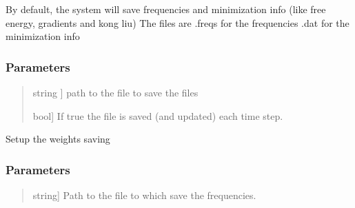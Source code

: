 \documentclass[a4paper,11pt,english]{sphinxmanual}
\begin{document}
\begin{fulllineitems}
\begin{fulllineitems}
\sphinxAtStartPar
By default, the system will save frequencies and minimization info (like free energy, gradients and kong liu)
The files are
.freqs   for the frequencies
.dat     for the minimization info


\subsubsection{Parameters}
\label{\detokenize{apireference:id45}}\begin{quote}
\begin{description}
\sphinxlineitem{fname}{[}string {]}
\sphinxAtStartPar
path to the file to save the files

\sphinxlineitem{save\_each\_step}{[}bool{]}
\sphinxAtStartPar
If true the file is saved (and updated) each time step.

\end{description}
\end{quote}

\end{fulllineitems}


\begin{fulllineitems}
\label{\detokenize{apireference:sscha.Utilities.IOInfo.SetupWeights}}
\pysigstartsignatures
{}
\pysigstopsignatures
\sphinxAtStartPar
Setup the weights saving


\subsubsection{Parameters}
\label{\detokenize{apireference:id46}}\begin{quote}
\begin{description}
\sphinxlineitem{fname}{[}string{]}
\sphinxAtStartPar
Path to the file to which save the frequencies.

\end{description}
\end{quote}

\end{fulllineitems}


\end{fulllineitems}
\end{document}
